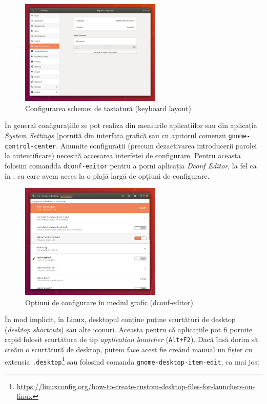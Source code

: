 \begin{figure}[!htbp]
  \centering
  \includegraphics[width=0.6\textwidth]{chapters/01-ui/img/keyboard-layout.png}
  \caption{Configurarea schemei de tastatură (keyboard layout)}
  \label{fig:ui:keyboard-layout}
\end{figure}

În general configurațiile se pot realiza din meniurile aplicațiilor sau din aplicația \textit{System Settings} (pornită din interfața grafică sau cu ajutorul comenzii \texttt{gnome-control-center}. Anumite configurații (precum dezactivarea introducerii parolei la autentificare) necesită accesarea interfeței de configurare. Pentru aceasta folosim comandda \texttt{dconf-editor} pentru a porni aplicația \textit{Dconf Editor}, la fel ca în , cu care avem acces la o plajă largă de opțiuni de configurare.

\begin{figure}[!htbp]
  \centering
  \includegraphics[width=0.6\textwidth]{chapters/01-ui/img/dconf-editor.png}
  \caption{Opțiuni de configurare în mediul grafic (dconf-editor)}
  \label{fig:ui:dconf-editor}
\end{figure}

În mod implicit, în Linux, desktopul conține puține scurtături de desktop (\textit{desktop shortcuts}) sau alte iconuri. Aceasta pentru că aplicațiile pot fi pornite rapid folosit scurtătura de tip \textit{application launcher} (\texttt{Alt+F2}). Dacă însă dorim să creăm o scurtătură de desktop, putem face acest fie creând manual un fișier cu extensia \texttt{.desktop}\footnote{\url{https://linuxconfig.org/how-to-create-custom-desktop-files-for-launchers-on-linux}} sau folosind comanda \texttt{gnome-desktop-item-edit}, ca mai jos:

